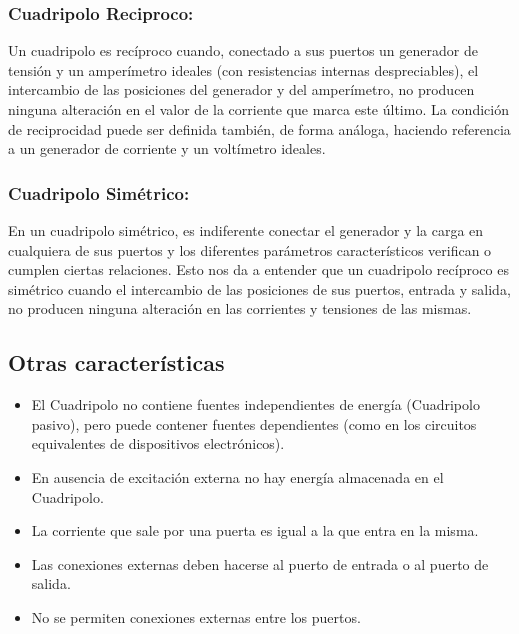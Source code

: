 \documentclass[../main.tex]{subfiles}
\begin{document}
{		\subsubsection{Cuadripolo Reciproco:}
		Un cuadripolo es recíproco cuando, conectado a sus puertos un generador de tensión y
		un amperímetro ideales (con resistencias internas despreciables), el intercambio de las
		posiciones del generador y del amperímetro, no producen ninguna alteración en el valor
		de la corriente que marca este último. La condición de reciprocidad puede ser definida
		también, de forma análoga, haciendo referencia a un generador de corriente y un 
		voltímetro ideales.
		}
		\subsubsection{Cuadripolo Simétrico:}
		En un cuadripolo simétrico, es indiferente conectar el generador y la carga en 
		cualquiera de sus puertos y los diferentes parámetros característicos verifican o 
		cumplen ciertas relaciones. Esto nos da a entender que un cuadripolo recíproco es 
		simétrico cuando el intercambio de las posiciones de sus puertos, entrada y salida,
		no producen ninguna alteración en las corrientes y tensiones de las mismas.

	{
	\renewcommand{\subsectionbreak}{}
	\subsection{Otras características}
	\begin{itemize}
    \item El Cuadripolo no contiene fuentes independientes de energía (Cuadripolo pasivo), 
		 pero puede contener fuentes dependientes (como en los circuitos equivalentes de dispositivos electrónicos). 
    \item  En ausencia de excitación externa no hay energía almacenada en el Cuadripolo. 
    \item  La corriente que sale por una puerta es igual a la que entra en la misma. 
    \item Las conexiones externas deben hacerse al puerto de entrada o al puerto de salida. 
    \item No se permiten conexiones externas entre los puertos.
	\end{itemize}
	}
\end{document}
